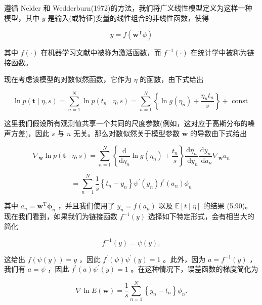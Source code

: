 \documentclass[10pt]{article}
\begin{document}
遵循 Nelder 和 Wedderburn(1972)的方法，我们将广义线性模型定义为这样一种模型，其中 \(y\) 是输入(或特征)变量的线性组合的非线性函数，使得

\[
y = f\left( {{\mathbf{w}}^{\mathrm{T}}\phi }\right)  \tag{5.91}
\]

其中 \(f\left( \cdot \right)\) 在机器学习文献中被称为激活函数，而 \({f}^{-1}\left( \cdot \right)\) 在统计学中被称为链接函数。

现在考虑该模型的对数似然函数，它作为 \(\eta\) 的函数，由下式给出

\[
\ln p\left( {\mathbf{t} \mid  \eta ,s}\right)  = \mathop{\sum }\limits_{{n = 1}}^{N}\ln p\left( {{t}_{n} \mid  \eta ,s}\right)  = \mathop{\sum }\limits_{{n = 1}}^{N}\left\{  {\ln g\left( {\eta }_{n}\right)  + \frac{{\eta }_{n}{t}_{n}}{s}}\right\}   + \text{ const } \tag{5.92}
\]

这里我们假设所有观测值共享一个共同的尺度参数(例如，这对应于高斯分布的噪声方差)，因此 \(s\) 与 \(n\) 无关。那么对数似然关于模型参数 \(\mathbf{w}\) 的导数由下式给出

\[
{\nabla }_{\mathbf{w}}\ln p\left( {\mathbf{t} \mid  \eta ,s}\right)  = \mathop{\sum }\limits_{{n = 1}}^{N}\left\{  {\frac{\mathrm{d}}{\mathrm{d}{\eta }_{n}}\ln g\left( {\eta }_{n}\right)  + \frac{{t}_{n}}{s}}\right\}  \frac{\mathrm{d}{\eta }_{n}}{\mathrm{\;d}{y}_{n}}\frac{\mathrm{d}{y}_{n}}{\mathrm{\;d}{a}_{n}}{\nabla }_{\mathbf{w}}{a}_{n}
\]

\[
= \mathop{\sum }\limits_{{n = 1}}^{N}\frac{1}{s}\left\{  {{t}_{n} - {y}_{n}}\right\}  {\psi }^{\prime }\left( {y}_{n}\right) {f}^{\prime }\left( {a}_{n}\right) {\phi }_{n} \tag{5.93}
\]

其中 \({a}_{n} = {\mathbf{w}}^{\mathrm{T}}{\mathbf{\phi }}_{n}\) ，并且我们使用了 \({y}_{n} = f\left( {a}_{n}\right)\) 以及 \(\mathbb{E}\left\lbrack  {t \mid  \eta }\right\rbrack\) 的结果 (5.90)。现在我们看到，如果我们为链接函数 \({f}^{-1}\left( y\right)\) 选择如下特定形式，会有相当大的简化

\[
{f}^{-1}\left( y\right)  = \psi \left( y\right) , \tag{5.94}
\]

这给出 \(f\left( {\psi \left( y\right) }\right)  = y\) ，因此 \({f}^{\prime }\left( \psi \right) {\psi }^{\prime }\left( y\right)  = 1\) 。此外，因为 \(a = {f}^{-1}\left( y\right)\) ，我们有 \(a = \psi\) ，因此 \({f}^{\prime }\left( a\right) {\psi }^{\prime }\left( y\right)  = 1\) 。在这种情况下，误差函数的梯度简化为

\[
\nabla \ln E\left( \mathbf{w}\right)  = \frac{1}{s}\mathop{\sum }\limits_{{n = 1}}^{N}\left\{  {{y}_{n} - {t}_{n}}\right\}  {\phi }_{n}. \tag{5.95}
\]
\end{document}
